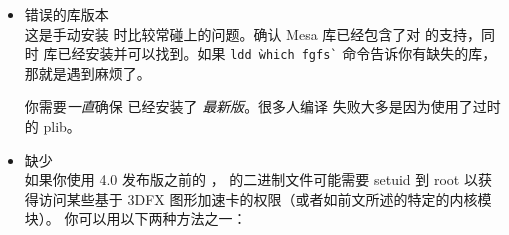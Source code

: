 \begin{itemize}

\ifchinese
\item{错误的库版本}\\
这是手动安装 \FlightGear{} 时比较常碰上的问题。确认 Mesa 库已经包含了对  的支持，同时  库已经安装并可以找到。如果 \texttt{ldd \` which fgfs\`} 命令告诉你有缺失的库，那就是遇到麻烦了。

你需要\emph{一直}确保 \PLIB{} 已经安装了 \emph{最新版}。很多人编译 \FlightGear{} 失败大多是因为使用了过时的 plib。
\fi
\iffalse
\IfLanguageName{english}{
\item{Wrong library versions}\\
  This is a rather common cause of grief especially when you prefer to
  install the libraries needed by \FlightGear{} by hand. Be sure that
  especially the Mesa library contains support for the
  \Index{3DFX} board and that \Index{GLIDE} libraries are installed and can be
  found. If a \texttt{ldd \`which fgfs\`} complains about missing
  libraries you are in trouble.

  You should also be sure to \emph{always} keep the \emph{latest} version
  of \PLIB{} on your system. Lots of people have
  failed miserably to compile \FlightGear{} just because of an outdated
  plib.
}{}
\IfLanguageName{french}{
\item{Mauvaises versions des biblioth\`{e}ques}\\
  C'est une origine assez commune de griefs tout sp\'{e}cialement lorsque vous
  pr\'{e}f\'{e}rez installer les biblioth\`{e}ques n\'{e}cessaires \`{a} \FlightGear{}
  \`{a} la main. V\'{e}rifiez bien que, en particulier, la biblioth\`{e}que Mesa comprend bien
  la prise en charge de la carte \Index{3DFX} et que les biblioth\`{e}ques \Index{GLIDE} sont install\'{e}es et qu'elles peuvent \^{e}tre
  trouv\'{e}es. Si un \texttt{ldd \`which fgfs\`} se plaint de biblioth\`{e}ques manquantes, alors vous aurez des difficult\'{e}s.

  Soyez \'{e}galement certain de \emph{toujours} disposer de la \emph{derni\`{e}re} version
  de \PLIB{} sur votre syst\`{e}me. De nombreuses personnes ont lamentablement \'{e}chou\'{e} \`{a} compiler \FlightGear{} simplement
  \`{a} cause d'une version trop ancienne de plib.
}{}
\fi

\ifchinese
\item{缺少}\\
如果你使用 4.0 发布版之前的 ，\FlightGear{} 的二进制文件可能需要 setuid 到 root 以获得访问某些基于 3DFX 图形加速卡的权限（或者如前文所述的特定的内核模块）。
你可以用以下两种方法之一：


\end{itemize}
